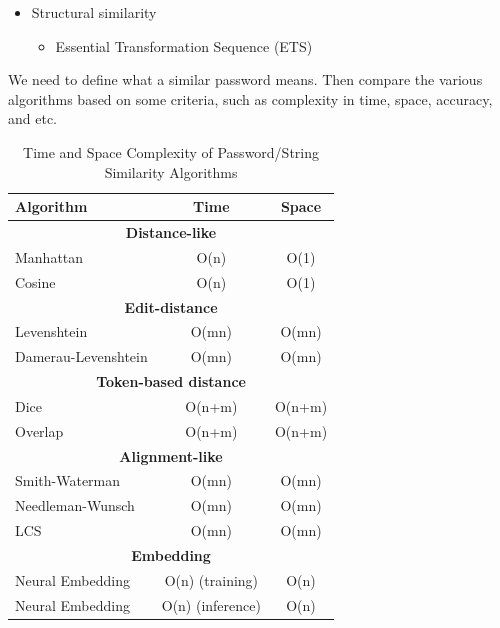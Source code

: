\begin{itemize}
\item Structural similarity
\begin{itemize}
    \item Essential Transformation Sequence (ETS)
\end{itemize}

\end{itemize}

\noindent{}

We need to define what a similar password means. Then compare the various algorithms based on some criteria, such as complexity in time, space, accuracy, and etc.

\begin{table}[h]
\centering
\footnotesize
\caption{Time and Space Complexity of Password/String Similarity Algorithms}
\begin{tabular}{lcc}
\textbf{Algorithm} & \textbf{Time} & \textbf{Space} \\
\midrule
\multicolumn{3}{c}{\textbf{Distance-like}} \\ \hline
Manhattan & O(n) & O(1) \\
Cosine & O(n) & O(1) \\
\multicolumn{3}{c}{\textbf{Edit-distance}} \\ \hline
Levenshtein & O(mn) & O(mn) \\
Damerau-Levenshtein & O(mn) & O(mn) \\
\multicolumn{3}{c}{\textbf{Token-based distance}} \\ \hline
Dice & O(n+m) & O(n+m) \\
Overlap & O(n+m) & O(n+m) \\
\multicolumn{3}{c}{\textbf{Alignment-like}} \\ \hline
Smith-Waterman & O(mn) & O(mn) \\
Needleman-Wunsch & O(mn) & O(mn) \\
LCS & O(mn) & O(mn) \\
\multicolumn{3}{c}{\textbf{Embedding}} \\ \hline
Neural Embedding & O(n) (training) & O(n) \\
Neural Embedding & O(n) (inference) & O(n) \\
\bottomrule
\end{tabular}
\end{table}

